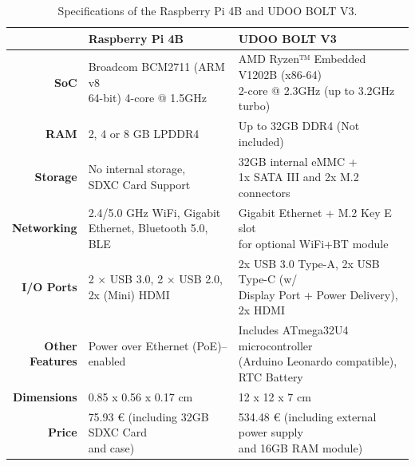 \renewcommand{\arraystretch}{2}
\begin{table}[H]
    \centering
    \begin{tabular}{r|l|l}
        & \textbf{Raspberry Pi 4B}& \textbf{UDOO BOLT V3}  \\ \hline
        \textbf{SoC} &  \makecell{Broadcom BCM2711 (ARM v8 \\ 64-bit) 4-core @ 1.5GHz} & \makecell{AMD Ryzen™ Embedded V1202B (x86-64) \\ 2-core @ 2.3GHz (up to 3.2GHz turbo)}\\
        \textbf{RAM} & 2, 4 or 8 GB LPDDR4 & Up to 32GB DDR4 (Not included) \\ 
        \textbf{Storage} & \makecell{No internal storage, \\ SDXC Card Support} & \makecell{32GB internal eMMC + \\1x SATA III and 2x M.2 connectors}\\
        \textbf{Networking} & \makecell{2.4/5.0 GHz WiFi, Gigabit \\ Ethernet, Bluetooth 5.0, BLE} & \makecell{Gigabit Ethernet + M.2 Key E slot \\ for optional WiFi+BT module}\\ 
        \textbf{I/O Ports} & \makecell{ 2 × USB 3.0, 2 × USB 2.0, \\ 2x (Mini) HDMI} & \makecell{2x USB 3.0 Type-A, 2x USB Type-C (w/ \\ Display Port + Power Delivery), 2x HDMI} \\
        \makecell[r]{\textbf{Other} \\\textbf{Features}} & Power over Ethernet (PoE)–enabled & \makecell{Includes ATmega32U4 microcontroller\\ (Arduino Leonardo compatible), \\ RTC Battery} \\   
        \textbf{Dimensions} & 0.85 x 0.56 x 0.17 cm & 12 x 12 x 7 cm \\
        \textbf{Price} & \makecell{75.93 € (including 32GB SDXC Card\\ and case)} & \makecell{534.48 € (including external power supply\\ and 16GB RAM module)} \\
    \end{tabular}
    \caption{Specifications of the Raspberry Pi 4B and UDOO BOLT V3.}
    \label{tab:comparsion-hardwareplatform}
\end{table}
\renewcommand{\arraystretch}{1}


